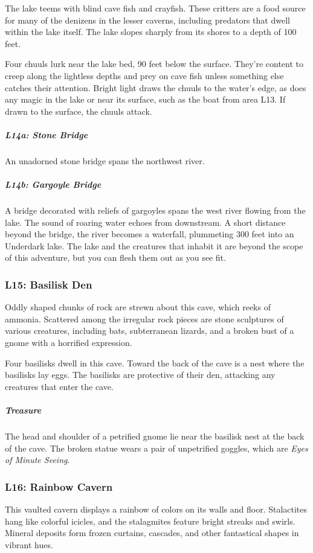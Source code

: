 \documentclass[10pt,a4paper,twoside,bg=print,twocolumn,openany,nodeprecatedcode]{dndbook}
\begin{document}
The lake teems with blind cave fish and crayfish. These critters are a food source for many of the denizens in the lesser caverns, including predators that dwell within the lake itself. The lake slopes sharply from its shores to a depth of 100 feet.

Four chuuls lurk near the lake bed, 90 feet below the surface. They're content to creep along the lightless depths and prey on cave fish unless something else catches their attention. Bright light draws the chuuls to the water's edge, as does any magic in the lake or near its surface, such as the boat from area L13. If drawn to the surface, the chuuls attack.

\subparagraph{L14a: Stone Bridge}
An unadorned stone bridge spans the northwest river.

\subparagraph{L14b: Gargoyle Bridge}
A bridge decorated with reliefs of gargoyles spans the west river flowing from the lake. The sound of roaring water echoes from downstream. A short distance beyond the bridge, the river becomes a waterfall, plummeting 300 feet into an Underdark lake. The lake and the creatures that inhabit it are beyond the scope of this adventure, but you can flesh them out as you see fit.

\subsubsection{L15: Basilisk Den}
\begin{DndReadAloud}{}
Oddly shaped chunks of rock are strewn about this cave, which reeks of ammonia. Scattered among the irregular rock pieces are stone sculptures of various creatures, including bats, subterranean lizards, and a broken bust of a gnome with a horrified expression.

\end{DndReadAloud}

Four basilisks dwell in this cave. Toward the back of the cave is a nest where the basilisks lay eggs. The basilisks are protective of their den, attacking any creatures that enter the cave.

\subparagraph{Treasure}
The head and shoulder of a petrified gnome lie near the basilisk nest at the back of the cave. The broken statue wears a pair of unpetrified goggles, which are \textit{Eyes of Minute Seeing}.

\subsubsection{L16: Rainbow Cavern}
\begin{DndReadAloud}{}
This vaulted cavern displays a rainbow of colors on its walls and floor. Stalactites hang like colorful icicles, and the stalagmites feature bright streaks and swirls. Mineral deposits form frozen curtains, cascades, and other fantastical shapes in vibrant hues.

\end{DndReadAloud}
\end{document}
